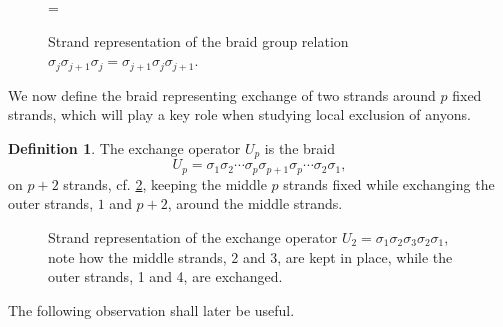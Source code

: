 \documentclass[a4paper,10pt,oneside]{book}
\theoremstyle{plain}
\theoremstyle{definition}
\newtheorem{definition}{Definition}[section]
\theoremstyle{remark}
\begin{document}
\begin{figure}[!htb]
  \centering
  {\quad}={\quad}
  \caption{Strand representation of the braid group relation $σ_j σ_{j+1} σ_j = σ_{j+1} σ_j σ_{j+1}.$}
  \label{fig:braid group rel2}
\end{figure}

We now define the braid representing exchange of two strands around $p$ fixed strands, which will play a key role when studying local exclusion of anyons.

\begin{definition}
  The exchange operator $U_p$ is the braid
  \begin{equation}
    U_p = σ_1 σ_2 \cdots σ_p σ_{p+1} σ_p \cdots σ_2 σ_1,
  \end{equation}
  on $p+2$ strands, cf. \cref{fig:Up on strands}, keeping the middle $p$ strands fixed while exchanging the outer strands, $1$ and $p+2$, around the middle strands.
\end{definition}

\begin{figure}[!htb]
  \centering
  \caption{Strand representation of the exchange operator $U_2 = σ_1 σ_2 σ_3 σ_2 σ_1$, note how the middle strands, 2 and 3, are kept in place, while the outer strands, 1 and 4, are exchanged.}
  \label{fig:Up on strands}
\end{figure}


The following observation shall later be useful.
\end{document}
